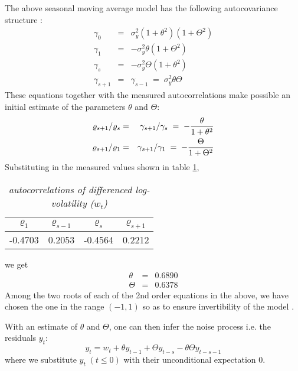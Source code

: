 The above seasonal moving average model has the following
autocovariance structure \cite{BoxJenkins94}:
\begin{eqnarray*}
  \gamma_0 &=& \sigma_y^2 (1 + \theta^2)(1 + \Theta^2) \\
  \gamma_1 &=& -\sigma_y^2\theta(1 + \Theta^2) \\
  \gamma_s &=& -\sigma_y^2\Theta(1 + \theta^2) \\
  \gamma_{s+1} &=& \gamma_{s-1}\;=\;\sigma_y^2\theta\Theta
\end{eqnarray*}
These equations together with the measured autocorrelations make
possible an initial estimate of the parameters $\theta$ and $\Theta$:
\begin{eqnarray*}
  {\varrho_{s+1}/\varrho_s} &=& {\gamma_{s+1}/\gamma_s} \;=\; -{\theta \over
    1 + \theta^2} \\
  {\varrho_{s+1}/\varrho_1} &=& {\gamma_{s+1}/\gamma_1} \;=\; -{\Theta \over
    1 + \Theta^2} \\
\end{eqnarray*}
Substituting in the measured values shown in table
\ref{tab:nordea_15min_w_acf},
\begin{table}[htb!]
  \centering
  \begin{tabular}{|c|c|c|c|}
    \hline
    $\varrho_1$ & $\varrho_{s-1}$ & $\varrho_s$ & $\varrho_{s+1}$ \\
    \hline
    -0.4703 &  0.2053 & -0.4564 &  0.2212 \\
    \hline
  \end{tabular}
  \caption{\small \it autocorrelations of differenced log-volatility
    ($w_t$)}
  \label{tab:nordea_15min_w_acf}
\end{table}
we get
\begin{eqnarray*}
  \theta &=& 0.6890 \\
  \Theta &=& 0.6378
\end{eqnarray*}
Among the two roots of each of the 2nd order equations in the above,
we have chosen the one in the range $(-1, 1)$ so as to ensure
invertibility of the model \cite{BoxJenkins94}.

With an estimate of $\theta$ and $\Theta$, one can then infer the
noise process i.e. the residuals $y_t$:
\begin{equation}
  \label{eq:infer_y}
  y_t = w_t + \theta y_{t-1} + \Theta y_{t-s} - \theta \Theta y_{t-s-1}
\end{equation}
where we substitute $y_t\;(t \leq 0)$ with their unconditional
expectation 0.

